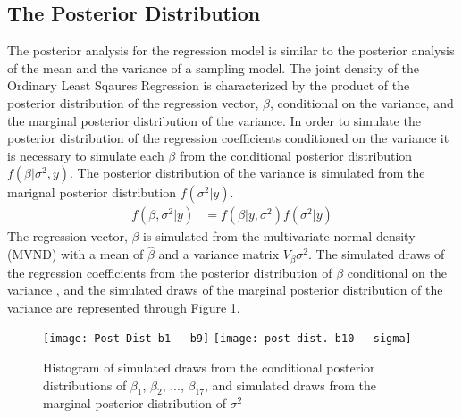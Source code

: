 \documentclass[12pt]{article}
\numberwithin{equation}{section}
\begin{document}
\begin{table}[]

\end{table}

\subsection{The Posterior Distribution}
The posterior analysis for the regression model is similar to the posterior analysis of the mean and the variance of a sampling model. The joint density of the Ordinary Least Sqaures Regression is characterized by the product of the posterior distribution of the regression vector, $\beta$, conditional on the variance, and the marginal posterior distribution of the variance. In order to simulate the posterior distribution of the regression coefficients  conditioned on the variance it is necessary to simulate each $\beta$ from the conditional posterior distribution $f(\beta | \sigma^2, y)$. The posterior distribution of the variance is simulated from the marignal posterior distribution $f(\sigma^2 | y)$. 
\begin{align}
f(\beta, \sigma^2 | y) & = f(\beta | y,\sigma^2) f(\sigma^2 | y)
\end{align}
The regression vector, $\beta$ is simulated from the multivariate normal density (MVND) with a mean of $\hat{\beta}$ and a variance matrix $V_{\beta} \sigma^2$. The simulated draws  of the regression coefficients from the posterior distribution of $\beta$ conditional on the variance , and the simulated draws of the marginal posterior distribution of the variance are represented through Figure 1.   

\begin{figure}
\caption{Histogram of simulated draws from the conditional posterior distributions of $\beta_1$, $\beta_2$, ..., $\beta_{17}$, and simulated draws from the marginal posterior distribution of  $\sigma^2$}
\graphicspath{ {//Users/robbiemead/Documents/Graduate School/Courses/Spring 2022/MATH 574/Project/Math 574 Project/} }
\texttt{[image: Post Dist b1 - b9]}
\texttt{[image: post dist. b10 - sigma]}
\centering
\end{figure}
\end{document}
